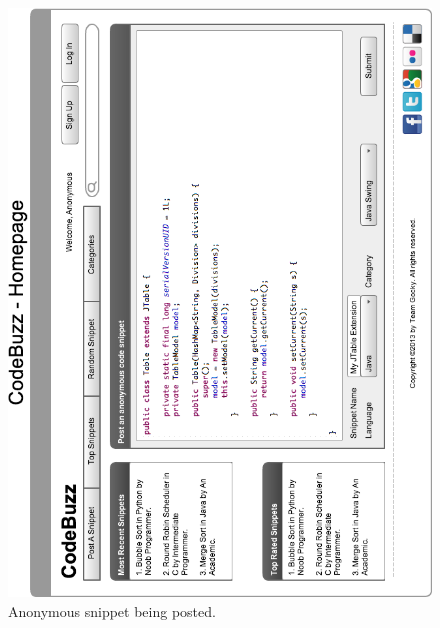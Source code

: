 \documentclass{sig-alt-release2}
\begin{document}
\begin{figure}
\includegraphics[width=\textwidth]{../imgs/homepageWireFrameGRHorz.png}
\caption{Anonymous snippet being posted.}
\label{fig:anonsnippet}
\end{figure}
\end{document}
